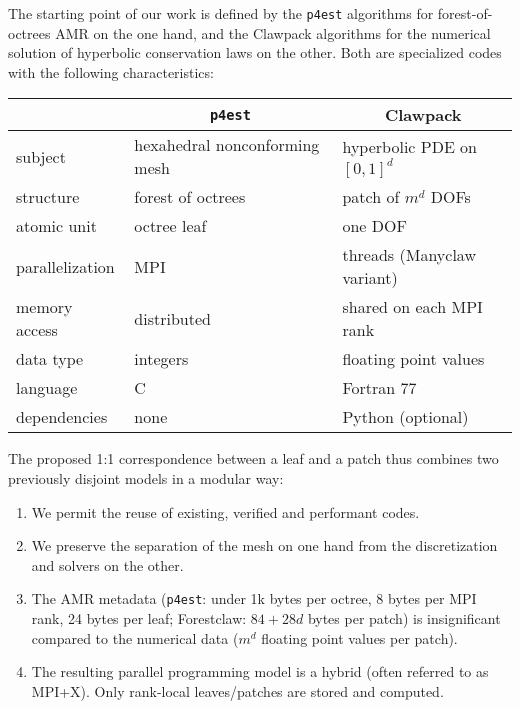 \documentclass{IOS-Book-Article}     %
\newcommand{\comment}[1]{\textcolor{green}{[DAC: #1]}\xspace}
\newcommand{\forestclaw}{Forestclaw\xspace}
\newcommand{\pforest}{\texttt{p4est}\xspace}
\begin{document}
The starting point of our work is defined by the \pforest algorithms for
forest-of-octrees AMR on the one hand, and the Clawpack algorithms for the
numerical solution of hyperbolic conservation laws
on the other.  Both are specialized codes with the following characteristics:
\begin{center}
\begin{tabular}{l|l|l}
& \multicolumn{1}{c|}{\pforest} & \multicolumn{1}{c}{Clawpack} \\
\hline
subject & hexahedral nonconforming mesh &  hyperbolic PDE on $[0, 1]^d$ \\
structure & forest of octrees & patch of $m^d$ DOFs \\
atomic unit & octree leaf & one DOF \\
parallelization & MPI & threads (Manyclaw variant) \\
memory access & distributed & shared on each MPI rank \\
data type & integers & floating point values \\
language & C & Fortran 77 \\
dependencies & none & Python (optional) \\
\end{tabular}
\end{center}
The proposed 1:1 correspondence between a leaf and a patch thus combines two
previously disjoint models in a modular way:
\begin{enumerate}
\item We permit the reuse of existing, verified and performant codes.
\item We preserve the separation of the mesh on one hand from the
discretization and solvers on the other.
\item The AMR metadata (\pforest:
under 1k bytes per octree, 8 bytes per MPI rank,
24 bytes per leaf; \forestclaw: $84 + 28d$ bytes per patch)
is insignificant compared to
the numerical data ($m^d$ floating point values per patch).
\item The resulting parallel programming model is a hybrid (often referred
to as MPI+X).  Only rank-local leaves/patches are stored and computed.
\end{enumerate}
\end{document}
